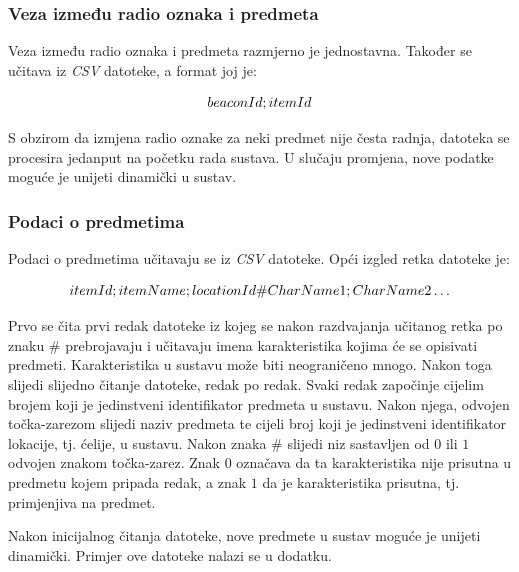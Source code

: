 \documentclass[times, utf8, diplomski, numeric]{fer}
\begin{document}
\subsubsection{Veza između radio oznaka i predmeta}
Veza između radio oznaka i predmeta razmjerno je jednostavna. Također se učitava
iz \emph{CSV} datoteke, a format joj je:

\begin{equation}
	\centering
	beaconId;itemId
\end{equation}

S obzirom da izmjena radio oznake za neki predmet nije česta radnja, datoteka se
procesira jedanput na početku rada sustava. U slučaju promjena, nove podatke
moguće je unijeti dinamički u sustav.

\subsubsection{Podaci o predmetima}
Podaci o predmetima učitavaju se iz \emph{CSV} datoteke. Opći izgled retka
datoteke je:

\begin{equation}
	\centering
	itemId;itemName;locationId\#CharName1;CharName2 \ldots
\end{equation}

Prvo se čita prvi redak datoteke iz kojeg se nakon razdvajanja učitanog retka po
znaku $\#$ prebrojavaju i učitavaju imena karakteristika kojima će se opisivati
predmeti. Karakteristika u sustavu može biti neograničeno mnogo. Nakon toga
slijedi slijedno čitanje datoteke, redak po redak. Svaki redak započinje
cijelim brojem koji je jedinstveni identifikator predmeta u sustavu. Nakon
njega, odvojen točka-zarezom slijedi naziv predmeta te cijeli broj koji je
jedinstveni identifikator lokacije, tj. ćelije, u sustavu. Nakon
znaka $\#$ slijedi niz sastavljen od $0$ ili $1$ odvojen znakom točka-zarez.
Znak $0$ označava da ta karakteristika nije prisutna u predmetu kojem pripada
redak, a znak $1$ da je karakteristika prisutna, tj. primjenjiva na predmet.

Nakon inicijalnog čitanja datoteke, nove predmete u sustav moguće je unijeti
dinamički. Primjer ove datoteke nalazi se u dodatku.
\end{document}
